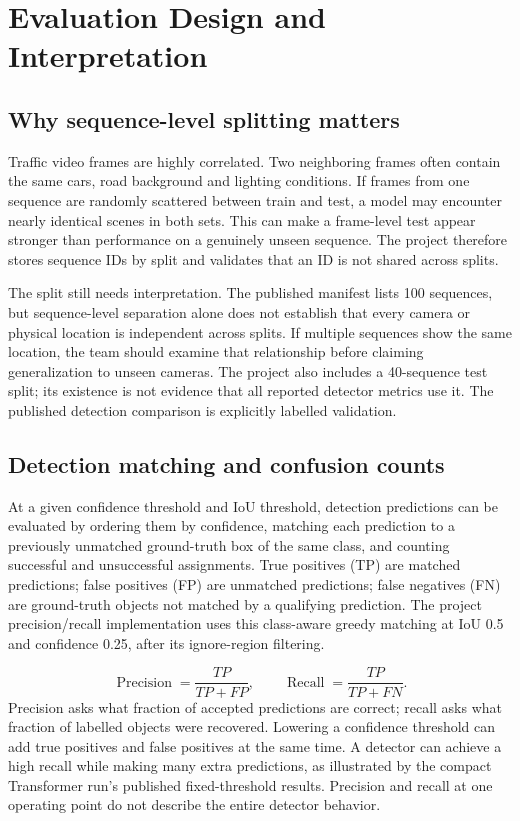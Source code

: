 \section{Evaluation Design and Interpretation}
\label{sec:evaluation-protocol}
\subsection{Why sequence-level splitting matters}
Traffic video frames are highly correlated. Two neighboring frames often contain the same cars, road background and lighting conditions. If frames from one sequence are randomly scattered between train and test, a model may encounter nearly identical scenes in both sets. This can make a frame-level test appear stronger than performance on a genuinely unseen sequence. The project therefore stores sequence IDs by split and validates that an ID is not shared across splits.

The split still needs interpretation. The published manifest lists 100 sequences, but sequence-level separation alone does not establish that every camera or physical location is independent across splits. If multiple sequences show the same location, the team should examine that relationship before claiming generalization to unseen cameras. The project also includes a 40-sequence test split; its existence is not evidence that all reported detector metrics use it. The published detection comparison is explicitly labelled validation.

\subsection{Detection matching and confusion counts}
At a given confidence threshold and IoU threshold, detection predictions can be evaluated by ordering them by confidence, matching each prediction to a previously unmatched ground-truth box of the same class, and counting successful and unsuccessful assignments. True positives (TP) are matched predictions; false positives (FP) are unmatched predictions; false negatives (FN) are ground-truth objects not matched by a qualifying prediction. The project precision/recall implementation uses this class-aware greedy matching at IoU 0.5 and confidence 0.25, after its ignore-region filtering.

\begin{equation}
\operatorname{Precision}=\frac{TP}{TP+FP},\qquad
\operatorname{Recall}=\frac{TP}{TP+FN}.
\end{equation}
Precision asks what fraction of accepted predictions are correct; recall asks what fraction of labelled objects were recovered. Lowering a confidence threshold can add true positives and false positives at the same time. A detector can achieve a high recall while making many extra predictions, as illustrated by the compact Transformer run's published fixed-threshold results. Precision and recall at one operating point do not describe the entire detector behavior.

